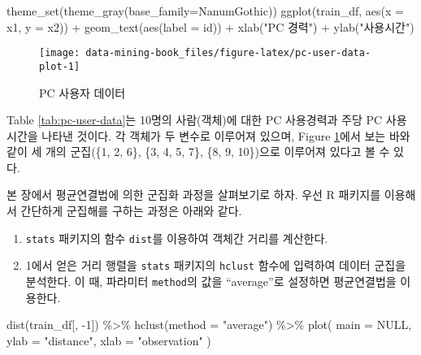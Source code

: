 \documentclass[
]{book}
\newenvironment{Shaded}{\begin{snugshade}}{\end{snugshade}}
\newcommand{\AttributeTok}[1]{\textcolor[rgb]{0.77,0.63,0.00}{#1}}
\newcommand{\ConstantTok}[1]{\textcolor[rgb]{0.00,0.00,0.00}{#1}}
\newcommand{\DecValTok}[1]{\textcolor[rgb]{0.00,0.00,0.81}{#1}}
\newcommand{\FunctionTok}[1]{\textcolor[rgb]{0.00,0.00,0.00}{#1}}
\newcommand{\NormalTok}[1]{#1}
\newcommand{\SpecialCharTok}[1]{\textcolor[rgb]{0.00,0.00,0.00}{#1}}
\newcommand{\StringTok}[1]{\textcolor[rgb]{0.31,0.60,0.02}{#1}}
\providecommand{\tightlist}{%
  \setlength{\itemsep}{0pt}\setlength{\parskip}{0pt}}
\begin{document}
\begin{Shaded}
\begin{Highlighting}[]
\FunctionTok{theme\_set}\NormalTok{(}\FunctionTok{theme\_gray}\NormalTok{(}\AttributeTok{base\_family=}\StringTok{\textquotesingle{}NanumGothic\textquotesingle{}}\NormalTok{))}
\FunctionTok{ggplot}\NormalTok{(train\_df, }\FunctionTok{aes}\NormalTok{(}\AttributeTok{x =}\NormalTok{ x1, }\AttributeTok{y =}\NormalTok{ x2)) }\SpecialCharTok{+}
  \FunctionTok{geom\_text}\NormalTok{(}\FunctionTok{aes}\NormalTok{(}\AttributeTok{label =}\NormalTok{ id)) }\SpecialCharTok{+}
  \FunctionTok{xlab}\NormalTok{(}\StringTok{"PC 경력"}\NormalTok{) }\SpecialCharTok{+}
  \FunctionTok{ylab}\NormalTok{(}\StringTok{"사용시간"}\NormalTok{)}
\end{Highlighting}
\end{Shaded}

\begin{figure}

{\centering \texttt{[image: data-mining-book\_files/figure-latex/pc-user-data-plot-1]} 

}

\caption{PC 사용자 데이터}\label{fig:pc-user-data-plot}
\end{figure}

Table \ref{tab:pc-user-data}는 10명의 사람(객체)에 대한 PC 사용경력과 주당 PC 사용시간을 나타낸 것이다. 각 객체가 두 변수로 이루어져 있으며, Figure \ref{fig:pc-user-data-plot}에서 보는 바와 같이 세 개의 군집(\{1, 2, 6\}, \{3, 4, 5, 7\}, \{8, 9, 10\})으로 이루어져 있다고 볼 수 있다.

본 장에서 평균연결법에 의한 군집화 과정을 살펴보기로 하자. 우선 R 패키지를 이용해서 간단하게 군집해를 구하는 과정은 아래와 같다.

\begin{enumerate}
\def\labelenumi{\arabic{enumi}.}
\tightlist
\item
  \texttt{stats} 패키지의 함수 \texttt{dist}를 이용하여 객체간 거리를 계산한다.
\item
  1에서 얻은 거리 행렬을 \texttt{stats} 패키지의 \texttt{hclust} 함수에 입력하여 데이터 군집을 분석한다. 이 때, 파라미터 \texttt{method}의 값을 ``average''로 설정하면 평균연결법을 이용한다.
\end{enumerate}

\begin{Shaded}
\begin{Highlighting}[]
\FunctionTok{dist}\NormalTok{(train\_df[, }\SpecialCharTok{{-}}\DecValTok{1}\NormalTok{]) }\SpecialCharTok{\%\textgreater{}\%}
  \FunctionTok{hclust}\NormalTok{(}\AttributeTok{method =} \StringTok{"average"}\NormalTok{) }\SpecialCharTok{\%\textgreater{}\%}
  \FunctionTok{plot}\NormalTok{(}
    \AttributeTok{main =} \ConstantTok{NULL}\NormalTok{,}
    \AttributeTok{ylab =} \StringTok{"distance"}\NormalTok{,}
    \AttributeTok{xlab =} \StringTok{"observation"}
\NormalTok{  )}
\end{Highlighting}
\end{Shaded}
\end{document}
